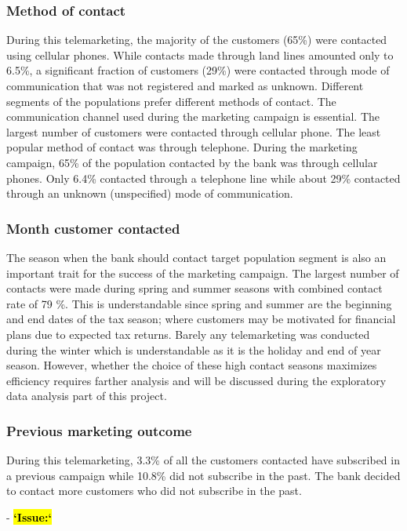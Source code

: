 \subsubsection*{Method of contact}
During this telemarketing, the majority of the customers (65\%) were contacted using cellular phones. While contacts made through land lines amounted only to 6.5\%, a significant fraction of customers (29\%) were contacted through mode of communication that was not registered and marked as unknown. Different segments of the populations prefer different methods of contact. The communication channel used during the marketing campaign is essential. The largest number of customers were contacted through cellular phone. The least popular method of contact was through telephone. During the marketing campaign, 65\% of the population contacted by the bank was through cellular phones. Only 6.4\% contacted through a telephone line while about 29\% contacted through an unknown (unspecified) mode of communication.

\subsubsection*{Month customer contacted}

The season when the bank should contact target population segment is also an important trait for the success of the marketing campaign. The largest number of contacts were made during spring and summer seasons with combined contact rate of 79 \%. This is understandable since spring and summer are the beginning and end dates of the tax season; where customers may be motivated for financial plans due to expected tax returns. Barely any telemarketing was conducted during the winter which is understandable as it is the holiday and end of year season. However, whether the choice of these high contact seasons maximizes efficiency requires farther analysis and will be discussed during the exploratory data analysis part of this project.  

\subsubsection*{Previous marketing outcome}
During this telemarketing, 3.3\% of all the customers contacted have subscribed in a previous campaign while 10.8\% did not subscribe in the past. The bank decided to contact more customers who did not subscribe in the past.  

- \hl{\textbf{`Issue:`}}

